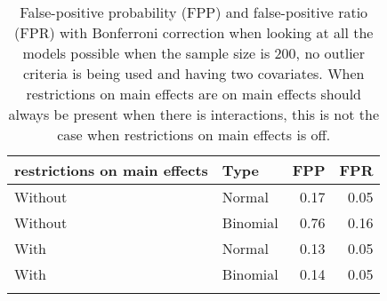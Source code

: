 \begin{longtable}{llrr}
\caption{False-positive probability (FPP) and false-positive ratio (FPR) with Bonferroni correction when looking at all the models possible when the sample size is 200, no outlier criteria is being used and having two covariates. When restrictions on main effects are on main effects should always be present when there is interactions, this is not the case when restrictions on main effects is off.} \\ 
  \hline
restrictions on main effects & Type & FPP & FPR \\ 
  \hline
Without & Normal & 0.17 & 0.05 \\ 
  Without & Binomial & 0.76 & 0.16 \\ 
  With & Normal & 0.13 & 0.05 \\ 
  With & Binomial & 0.14 & 0.05 \\ 
   \hline
\hline
\label{tab:resultFullBC}
\end{longtable}
